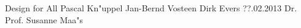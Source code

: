 \documentclass{header}
\begin{document}
        	{Design for All}
			{Pascal Kn"uppel}
			{Jan-Bernd Vosteen}
			{Dirk Evers}
			{??.02.2013}
			{Dr. Prof. Susanne Maa"s}
         
 \tableofcontents
 
\newpage
\pagestyle{fancy}
 \setcounter{page}{1}  










 
\end{document}

